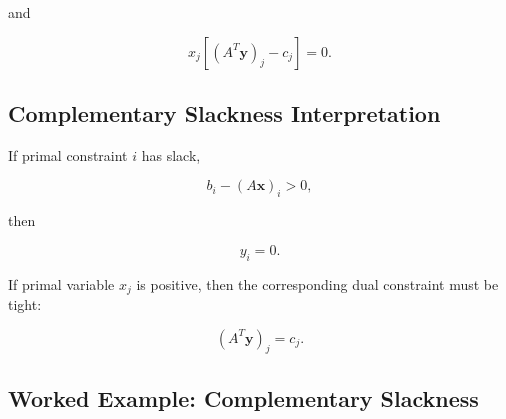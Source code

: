 and

\[
\boxed{
x_j
[
(A^T\mathbf{y})_j-c_j
]
=
0.
}
\]

\subsection{Complementary Slackness Interpretation}
\label{subsec:complementary-slackness-interpretation}

If primal constraint \(i\) has slack,

\[
b_i-(A\mathbf{x})_i>0,
\]

then

\[
\boxed{
y_i=0.
}
\]

If primal variable \(x_j\) is positive, then the corresponding dual
constraint must be tight:

\[
\boxed{
(A^T\mathbf{y})_j=c_j.
}
\]

\subsection{Worked Example: Complementary Slackness}
\label{subsec:worked-complementary-slackness}

